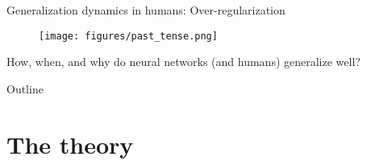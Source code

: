 \documentclass{beamer}
\begin{document}
\begin{frame}{Generalization dynamics in humans: Over-regularization}
\begin{figure}
\texttt{[image: figures/past\_tense.png]}
\end{figure}
\end{frame}

\begin{frame}[standout]
How, when, and why do neural networks (and humans) generalize well?
\end{frame}

\begin{frame}{Outline}
\vspace{1em}
\tableofcontents
\end{frame}

\section{The theory}
\end{document}
